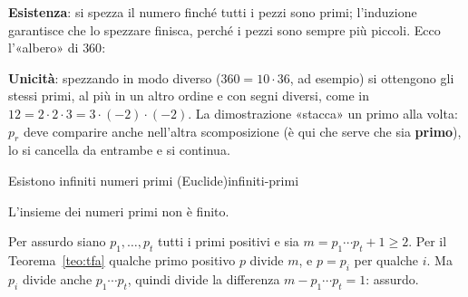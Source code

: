 \begin{spiegazione}
    \textbf{Esistenza}: si spezza il numero finché tutti i pezzi sono primi; l'induzione garantisce che lo spezzare finisca, perché i
    pezzi sono sempre più piccoli. Ecco l'«albero» di $360$:
    \begin{center}
    \end{center}
    \textbf{Unicità}: spezzando in modo diverso ($360 = 10 \cdot 36$, ad esempio) si ottengono gli stessi primi, al più in un altro ordine e
    con segni diversi, come in $12 = 2 \cdot 2 \cdot 3 = 3 \cdot (-2) \cdot (-2)$. La dimostrazione «stacca» un primo alla volta: $p_r$ deve comparire
    anche nell'altra scomposizione (è qui che serve che sia \textbf{primo}), lo si cancella da entrambe e si continua.
\end{spiegazione}

\begin{concetto}
\begin{Corollario}{Esistono infiniti numeri primi (Euclide)}{infiniti-primi}
    \begin{prerequisiti}
    \end{prerequisiti}
    L'insieme dei numeri primi non è finito.
\end{Corollario}
\begin{dimostrazione}
    Per assurdo siano $p_1, \dots, p_t$ tutti i primi positivi e sia $m = p_1 \cdots p_t + 1 \geq 2$. Per il Teorema~\ref{teo:tfa} qualche primo
    positivo $p$ divide $m$, e $p = p_i$ per qualche $i$. Ma $p_i$ divide anche $p_1 \cdots p_t$, quindi divide la differenza
    $m - p_1 \cdots p_t = 1$: assurdo.
\end{dimostrazione}
\end{concetto}

